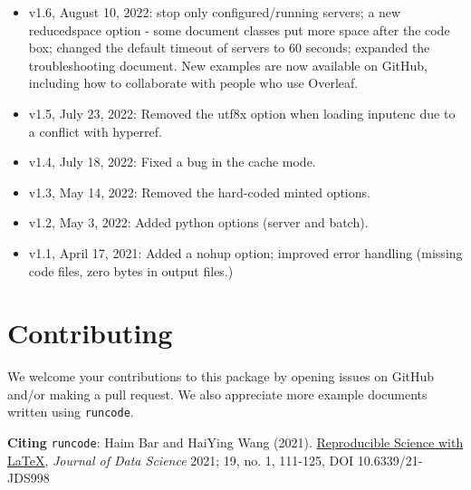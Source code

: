 \documentclass{ltxdoc}
\begin{document}
\begin{itemize}
\item v1.6, August 10, 2022: stop only configured/running servers; a new
reducedspace option - some document classes put more space after the code box;
changed the default timeout of servers to 60 seconds; expanded the
troubleshooting document. New examples are now available on GitHub, including
how to collaborate with people who use Overleaf.
\item v1.5, July 23, 2022: Removed the utf8x option when loading inputenc due to a
conflict with hyperref.
\item v1.4, July 18, 2022: Fixed a bug in the cache mode.
\item v1.3, May 14, 2022: Removed the hard-coded minted options.
\item v1.2, May 3, 2022: Added python options (server and batch).
\item v1.1, April 17, 2021: Added a nohup option; improved error handling (missing
code files, zero bytes in output files.)
\end{itemize}

\section{Contributing}
\label{sec:orged22cfb}
We welcome your contributions to this package by opening issues on
GitHub and/or making a pull request. We also appreciate more example
documents written using \texttt{runcode}.


\textbf{Citing} \texttt{runcode}:
Haim Bar and HaiYing Wang (2021). \href{https://jds-online.org/journal/JDS/article/103/info}{Reproducible Science with \LaTeX{}},
\emph{Journal of Data Science} 2021; 19, no. 1, 111-125, DOI 10.6339/21-JDS998
\end{document}
